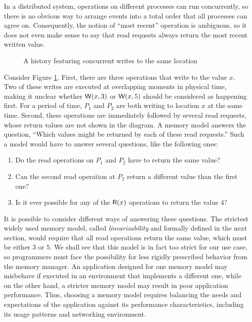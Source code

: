 \documentclass[]             %
{NASA}                       %
\theoremstyle{definition}
\newtheorem{example}[theorem]{Example}
\begin{document}
In a distributed system, operations on different processes can run
concurrently, so there is no obvious way to arrange events into a
total order that all processes can agree on. Consequently, the notion
of ``most recent'' operation is ambiguous, so it does not even make
sense to say that read requests always return the most recent written
value.

\begin{figure}[h]
  
  \caption{A history featuring concurrent writes to the same location}
  \label{fig:dsm-example-2}
\end{figure}


Consider Figure \ref{fig:dsm-example-2}. First, there are three operations that write to the value $x$.  Two of
these writes are executed at overlapping moments in physical time,
making it unclear whether $\mathsf{W}\!\left(x, 3\right)$ or $\mathsf{W}\!\left(x, 5\right)$
should be considered as happening first. For a period of time, $P_1$
and $P_2$ are both writing to location $x$ at the same time. Second,
these operations are immediately followed by several read requests,
whose return values are not shown in the diagram. A memory model
answers the question, ``Which values might be returned by each of
these read requests.'' Such a model would have to answer several
questions, like the following ones:
\begin{enumerate}
\item Do the read operations on $P_1$ and $P_2$ have to return the same value?
\item Can the second read operation at $P_2$ return a different value
  than the first one?
\item Is it ever possible for any of the $\mathsf{R}\!\left(x\right)$ operations to
  return the value 4?
\end{enumerate}

It is possible to consider different ways of answering these
questions. The strictest widely used memory model, called
\emph{linearizability} and formally defined in the next section, would
require that all read operations return the same value, which must be
either $3$ or $5$. We shall see that this model is in fact too strict
for our use case, so programmers must face the possibility for less
rigidly prescribed behavior from the memory manager. An application
designed for one memory model may misbehave if executed in an
environment that implements a different one, while on the other hand,
a stricter memory model may result in poor application
performance. Thus, choosing a memory model requires balancing the
needs and expectations of the application against its performance
characteristics, including its usage patterns and networking
environment.
\end{document}
